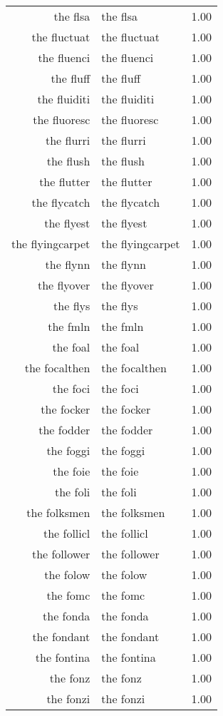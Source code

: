 \begin{table}[ht]
\begin{tabular}{rlr}
  the flsa & the flsa & 1.00 \\ 
  the fluctuat & the fluctuat & 1.00 \\ 
  the fluenci & the fluenci & 1.00 \\ 
  the fluff & the fluff & 1.00 \\ 
  the fluiditi & the fluiditi & 1.00 \\ 
  the fluoresc & the fluoresc & 1.00 \\ 
  the flurri & the flurri & 1.00 \\ 
  the flush & the flush & 1.00 \\ 
  the flutter & the flutter & 1.00 \\ 
  the flycatch & the flycatch & 1.00 \\ 
  the flyest & the flyest & 1.00 \\ 
  the flyingcarpet & the flyingcarpet & 1.00 \\ 
  the flynn & the flynn & 1.00 \\ 
  the flyover & the flyover & 1.00 \\ 
  the flys & the flys & 1.00 \\ 
  the fmln & the fmln & 1.00 \\ 
  the foal & the foal & 1.00 \\ 
  the focalthen & the focalthen & 1.00 \\ 
  the foci & the foci & 1.00 \\ 
  the focker & the focker & 1.00 \\ 
  the fodder & the fodder & 1.00 \\ 
  the foggi & the foggi & 1.00 \\ 
  the foie & the foie & 1.00 \\ 
  the foli & the foli & 1.00 \\ 
  the folksmen & the folksmen & 1.00 \\ 
  the follicl & the follicl & 1.00 \\ 
  the follower & the follower & 1.00 \\ 
  the folow & the folow & 1.00 \\ 
  the fomc & the fomc & 1.00 \\ 
  the fonda & the fonda & 1.00 \\ 
  the fondant & the fondant & 1.00 \\ 
  the fontina & the fontina & 1.00 \\ 
  the fonz & the fonz & 1.00 \\ 
  the fonzi & the fonzi & 1.00 \\ 

\end{tabular}
\end{table}
